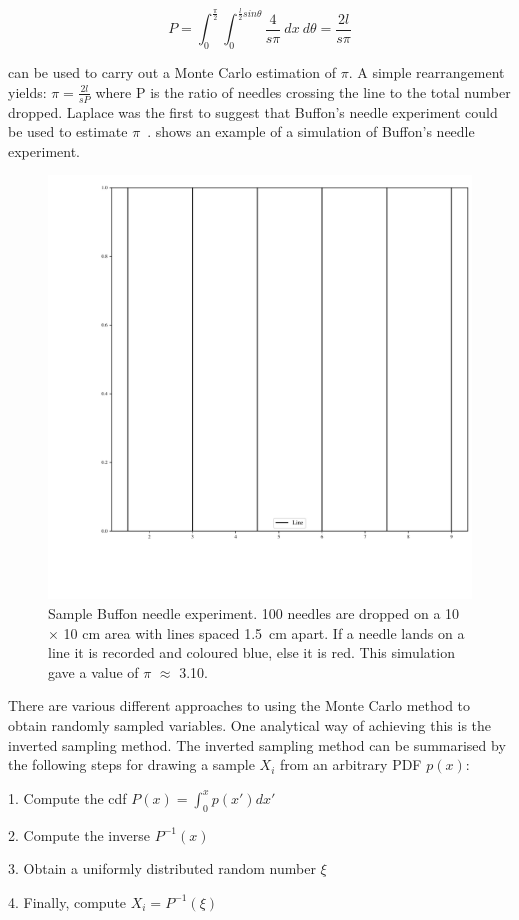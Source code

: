 \begin{equation}
P=\int_0^{\frac{\pi}{2}}\int_0^{\frac{l}{2}sin\theta}\frac{4}{s\pi}\ dx\ d\theta = \frac{2 l}{s \pi}\label{eqn:buffon}
\end{equation}


 can be used to carry out a Monte Carlo estimation of $\pi$. A simple rearrangement yields: $\pi = \tfrac{2l}{sP}$ where P is the ratio of needles crossing the line to the total number dropped. Laplace was the first to suggest that Buffon's needle experiment could be used to estimate $\pi$~\cite{beckmann2015history}. 
 shows an example of a simulation of Buffon's needle experiment.

\begin{figure}[!htb]
\centering
\includegraphics[width=.5\textwidth]{buffon.pdf}
\caption{Sample Buffon needle experiment. 100 needles are dropped on a 10 $\times$ 10 cm area with lines spaced 1.5~cm apart. If a needle lands on a line it is recorded and coloured blue, else it is red. This simulation gave a value of $\pi$ $\approx$ 3.10.}
\label{fig:buffon-needle}
\end{figure}

There are various different approaches to using the Monte Carlo method to obtain randomly sampled variables.
One analytical way of achieving this is the inverted sampling method.
The inverted sampling method can be summarised by the following steps for drawing a sample $X_i$ from an arbitrary PDF $p(x)$:

\medskip

1. Compute the \gls*{cdf} $P(x)=\int^{x}_{0}p(x')dx'$

2. Compute the inverse $P^{-1}(x)$

3. Obtain a uniformly distributed random number $\xi$

4. Finally, compute $X_i = P^{-1}(\xi)$

